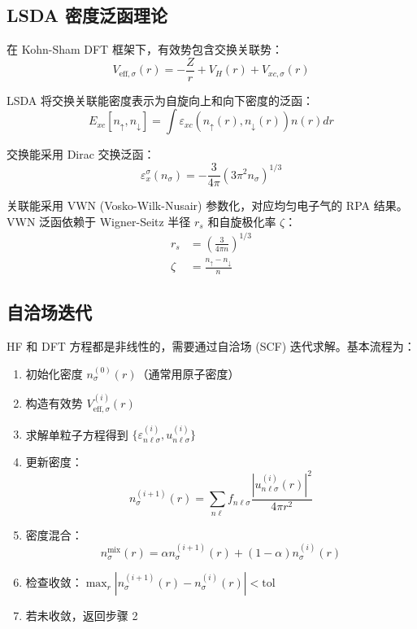 \documentclass[12pt,a4paper]{article}
\begin{document}
\subsection{LSDA 密度泛函理论}

在 Kohn-Sham DFT 框架下，有效势包含交换关联势：
\begin{equation}
    V_{\text{eff},\sigma}(r) = -\frac{Z}{r} + V_H(r) + V_{xc,\sigma}(r)
\end{equation}

LSDA 将交换关联能密度表示为自旋向上和向下密度的泛函：
\begin{equation}
    E_{xc}[n_\uparrow, n_\downarrow] = \int \varepsilon_{xc}(n_\uparrow(r), n_\downarrow(r)) n(r) dr
\end{equation}

交换能采用 Dirac 交换泛函：
\begin{equation}
    \varepsilon_x^\sigma(n_\sigma) = -\frac{3}{4\pi}\left( 3\pi^2 n_\sigma \right)^{1/3}
\end{equation}

关联能采用 VWN (Vosko-Wilk-Nusair) 参数化，对应均匀电子气的 RPA 结果。VWN 泛函依赖于 Wigner-Seitz 半径 $r_s$ 和自旋极化率 $\zeta$：
\begin{align}
    r_s   & = \left( \frac{3}{4\pi n} \right)^{1/3} \\
    \zeta & = \frac{n_\uparrow - n_\downarrow}{n}
\end{align}

\subsection{自洽场迭代}

HF 和 DFT 方程都是非线性的，需要通过自洽场 (SCF) 迭代求解。基本流程为：

\begin{enumerate}
    \item 初始化密度 $n_\sigma^{(0)}(r)$（通常用原子密度）
    \item 构造有效势 $V_{\text{eff},\sigma}^{(i)}(r)$
    \item 求解单粒子方程得到 $\{\varepsilon_{n\ell\sigma}^{(i)}, u_{n\ell\sigma}^{(i)}\}$
    \item 更新密度：
          \begin{equation}
              n_\sigma^{(i+1)}(r) = \sum_{n\ell} f_{n\ell\sigma} \frac{|u_{n\ell\sigma}^{(i)}(r)|^2}{4\pi r^2}
          \end{equation}
    \item 密度混合：
          \begin{equation}
              n_\sigma^{\text{mix}}(r) = \alpha n_\sigma^{(i+1)}(r) + (1-\alpha) n_\sigma^{(i)}(r)
          \end{equation}
    \item 检查收敛：$\max_r |n_\sigma^{(i+1)}(r) - n_\sigma^{(i)}(r)| < \text{tol}$
    \item 若未收敛，返回步骤 2
\end{enumerate}
\end{document}
